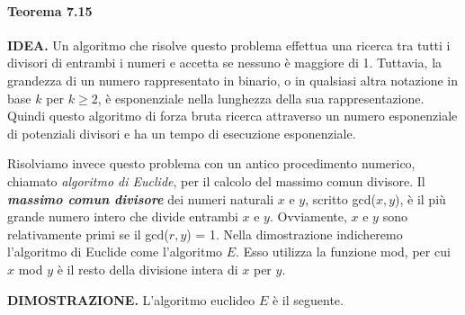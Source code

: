 \documentclass{article}
\begin{document}
\paragraph{Teorema 7.15}
\label{teorema-7.15}

\text{}
\newline
\textbf{IDEA.}
Un algoritmo che risolve questo problema effettua una ricerca tra tutti i divisori di entrambi i numeri e accetta se nessuno è maggiore di 1.
Tuttavia, la grandezza di un numero rappresentato in binario, o in qualsiasi altra notazione in base $k$ per $k \geq 2$, è esponenziale nella lunghezza della sua rappresentazione.
Quindi questo algoritmo di forza bruta ricerca attraverso un numero esponenziale di potenziali divisori e ha un tempo di esecuzione esponenziale.

Risolviamo invece questo problema con un antico procedimento numerico, chiamato \textit{algoritmo di Euclide}, per il calcolo del massimo comun divisore.
Il \textbf{\textit{massimo comun divisore}} dei numeri naturali $x$ e $y$, scritto gcd($x, y$), è il più grande numero intero che divide entrambi $x$ e $y$.
Ovviamente, $x$ e $y$ sono relativamente primi se il gcd($r,y$) = 1.
Nella dimostrazione indicheremo l'algoritmo di Euclide come l'algoritmo $E$.
Esso utilizza la funzione mod, per cui $x$ mod $y$ è il resto della divisione intera di $x$ per $y$.

\text{}
\newline
\textbf{DIMOSTRAZIONE.}
L'algoritmo euclideo $E$ è il seguente.
\end{document}
